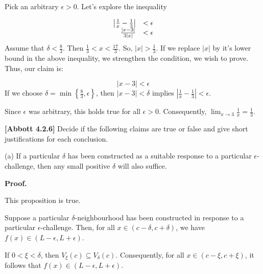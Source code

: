 \documentclass[10pt]{article}
\begin{document}
Pick an arbitrary $\displaystyle \epsilon  >0$. Let's explore the inequality 




\begin{equation*}
\begin{array}{ r l }
\left| \frac{1}{x} -\frac{1}{3}\right|  & < \epsilon \\
\frac{|x-3|}{3|x|} & < \epsilon 
\end{array}
\end{equation*}
Assume that $\displaystyle \delta < \frac{8}{3}$. Then $\displaystyle \frac{1}{3} < x< \frac{17}{3}$. So, $\displaystyle |x| >\frac{1}{3}$. If we replace $\displaystyle |x|$ by it's lower bound in the above inequality, we strengthen the condition, we wish to prove. Thus, our claim is:


\begin{equation*}
|x-3|< \epsilon 
\end{equation*}
 If we choose $\displaystyle \delta =\min\left\{\frac{8}{3} ,\epsilon \right\}$, then $\displaystyle |x-3|< \delta $ implies $\displaystyle \left| \frac{1}{x} -\frac{1}{3}\right| < \epsilon $. 



Since $\displaystyle \epsilon $ was arbitrary, this holds true for all $\displaystyle \epsilon  >0$. Consequently, $\displaystyle \lim _{x\rightarrow 3}\frac{1}{x} =\frac{1}{3}$.



\textbf{[Abbott 4.2.6] }Decide if the following claims are true or false and give short justifications for each conclusion.



(a) If a particular $\displaystyle \delta $ has been constructed as a suitable response to a particular $\displaystyle \epsilon $-challenge, then any small positive $\displaystyle \delta $ will also suffice.



\textbf{Proof.}



This proposition is true.



Suppose a particular $\displaystyle \delta $-neighbourhood has been constructed in response to a particular $\displaystyle \epsilon $-challenge. Then, for all $\displaystyle x\in ( c-\delta ,c+\delta )$, we have $\displaystyle f( x) \in ( L-\epsilon ,L+\epsilon )$. 



If $\displaystyle 0< \xi < \delta $, then $\displaystyle V_{\xi }( c) \subseteq V_{\delta }( c)$. Consequently, for all $\displaystyle x\in ( c-\xi ,c+\xi )$, it follows that $\displaystyle f( x) \in ( L-\epsilon ,L+\epsilon )$.
\end{document}
